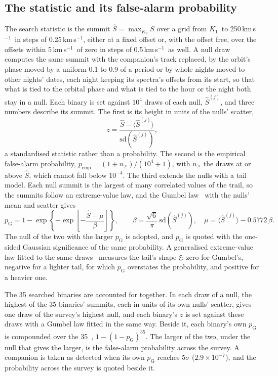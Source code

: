 \documentclass[3p,11pt]{elsarticle}
\newcommand{\kms}{km\,s$^{-1}$}
\newcommand{\Kone}{$K_1$}
\begin{document}
\subsection{The statistic and its false-alarm probability}\label{sec:stat}

The search statistic is the summit $\hat S = \max_{K_2} S$ over a grid from \Kone\ to 250\,\kms\
in steps of 0.25\,\kms, either at a fixed offset or, with the offset free, over the offsets within
5\,\kms\ of zero in steps of 0.5\,\kms\ as well. A null draw computes the same summit with the
companion's track replaced, by the orbit's phase moved by a uniform 0.1 to 0.9 of a period or by
whole nights moved to other nights' dates, each night keeping its spectra's offsets from its start,
so that what is tied to the orbital phase and what is tied to the hour or the night both stay in a
null. Each binary is set against $10^4$ draws of each null, $\hat S^{(j)}$, and three numbers
describe its summit. The first is its height in units of the nulls' scatter,
\begin{equation}
z = \frac{\hat S - \langle \hat S^{(j)} \rangle}{\mathrm{sd}(\hat S^{(j)})},
\end{equation}
a standardised statistic rather than a probability. The second is the empirical false-alarm
probability, $p_\mathrm{emp} = (1 + n_\ge)/(10^4 + 1)$, with $n_\ge$ the draws at or above $\hat
S$, which cannot fall below $10^{-4}$. The third extends the nulls with a tail model. Each null
summit is the largest of many correlated values of the trail, so the summits follow an
extreme-value law, and the Gumbel law~\cite{Gumbel1958} with the nulls' mean and scatter gives
\begin{equation}
p_\mathrm{G} = 1 - \exp\!\left\{-\exp\!\left[-\frac{\hat S - \mu}{\beta}\right]\right\},\qquad
\beta = \frac{\sqrt{6}}{\pi}\,\mathrm{sd}(\hat S^{(j)}),\quad \mu = \langle \hat S^{(j)} \rangle - 0.5772\,\beta .
\end{equation}
The null of the two with the larger $p_\mathrm{G}$ is adopted, and $p_\mathrm{G}$ is quoted with
the one-sided Gaussian significance of the same probability. A generalised extreme-value law fitted
to the same draws~\cite{Coles2001} measures the tail's shape $\xi$: zero for Gumbel's, negative for
a lighter tail, for which $p_\mathrm{G}$ overstates the probability, and positive for a heavier one.

The 35 searched binaries are accounted for together. In each draw of a null, the highest of the 35
binaries' summits, each in units of its own nulls' scatter, gives one draw of the survey's highest
null, and each binary's $z$ is set against these draws with a Gumbel law fitted in the same way.
Beside it, each binary's own $p_\mathrm{G}$ is compounded over the 35~\cite{Sidak1967},
$1 - (1 - p_\mathrm{G})^{35}$. The larger of the two, under the null that gives the larger, is the
false-alarm probability across the survey. A companion is taken as detected when its own
$p_\mathrm{G}$ reaches $5\sigma$ ($2.9\times10^{-7}$), and the probability across the survey is
quoted beside it.
\end{document}
